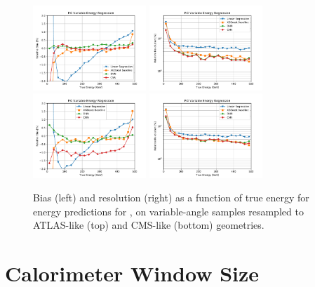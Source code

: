 \begin{figure}[htbp]
\centering
\includegraphics[width=0.38\textwidth]{Images/Calo/bias_vs_E_Pi0_variable_ATLAS.pdf}
\includegraphics[width=0.38\textwidth]{Images/Calo/res_vs_E_Pi0_variable_ATLAS.pdf} \\
\includegraphics[width=0.38\textwidth]{Images/Calo/bias_vs_E_Pi0_variable_CMS.pdf}
\includegraphics[width=0.38\textwidth]{Images/Calo/res_vs_E_Pi0_variable_CMS.pdf}
\caption{Bias (left) and resolution (right) as a function of true energy for energy predictions for \pizero, on variable-angle samples resampled to  ATLAS-like (top) and CMS-like (bottom) geometries.\label{fig:reg_resampled_pi0_ATLAS_CMS}}
\end{figure}

\section{Calorimeter Window Size}\label{calo_rec_window_size}


